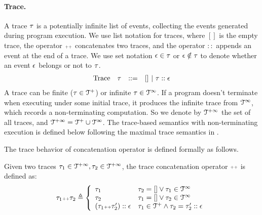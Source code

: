 \paragraph{Trace.}
%
A trace $\mathtt{\tau}$ is a potentially infinite list of events, 
collecting the events generated  during program execution. 
We use list notation for traces, where $[]$ is the empty trace,
the operator ${\scriptscriptstyle ++}$ concatenates two traces, and the operator $::$ appends an event at the end of a trace. We use set notation $\mathtt{\epsilon} \in \mathtt{\tau}$ or $\mathtt{\epsilon} \notin \mathtt{\tau}$ to denote whether an event $\mathtt{\epsilon}$ belongs or not to $\mathtt{\tau}$.
\[
\begin{array}{llll}
\mbox{Trace} & \mathtt{\tau}
& ::= & [] ~|~ \mathtt{\tau} :: \mathtt{\epsilon} 
\end{array}
\]
{
A trace can be finite ($\mathtt{\tau} \in \mathcal{T}^{+}$) or infinite $\mathtt{\tau} \in \mathcal{T}^{\infty}$.
If a program doesn't terminate when executing under some initial trace,
it produces the infinite trace 
from $\mathcal{T}^{\infty}$, which records a non-terminating computation.
So we denote by $\mathcal{T}^{+\infty}$ the set of all traces, and $\mathcal{T}^{+\infty} = \mathcal{T}^{+} \cup \mathcal{T}^{\infty}$.
The trace-based semantics with non-terminating execution is defined below following the maximal trace semantics in \cite{Cousot19}.}

The trace behavior of concatenation operator is defined formally as follows.
\begin{defn}
  \label{def:trace_concate}
Given two traces $\mathtt{\tau}_1 \in \mathcal{T}^{+\infty}, \mathtt{\tau}_2 \in \mathcal{T}^{+\infty}$, the trace concatenation operator 
${\scriptscriptstyle ++}$ is defined as:
\[
\trace_1 \tracecat \trace_2 \triangleq
\left\{
\begin{array}{ll} 
  \trace_1 & \trace_2 = [] \lor \trace_1 \in \inftdom \\
  \trace_2 & \trace_1 = [] \lor \trace_2 \in \inftdom \\
  (\trace_1   \tracecat \trace_2'):: \event & \trace_1 \in \ftdom \land \trace_2 = \trace_2' :: \event
\end{array}
\right.
\]
\end{defn}


